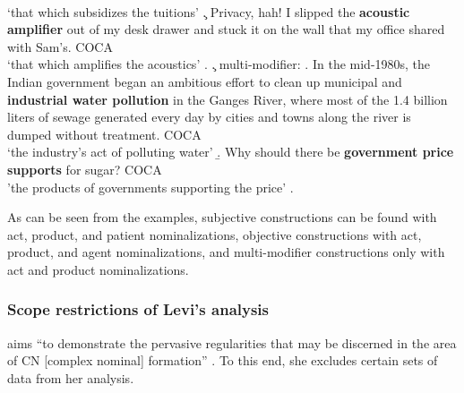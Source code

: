 \\`that which subsidizes the tuitions'
\c. \label{ex:acoustic_amplifier}
Privacy, hah! I slipped the \textbf{acoustic amplifier} out of my desk
drawer and stuck it on the wall that my office shared with Sam's. COCA
\\`that which amplifies the acoustics'
\z.
\c. multi-modifier:
\a.  \label{ex:industrial_water_pollution}
In the mid-1980s, the Indian government began an ambitious effort
to clean up municipal and \textbf{industrial water pollution} in the Ganges
River, where most of the 1.4 billion liters of sewage generated every
day by cities and towns along the river is dumped without treatment. COCA 
\\`the industry's act of polluting water'
\b. \label{ex:government_price_supports}
Why should there be \textbf{government price supports} for sugar? COCA
\\'the products of governments supporting the price'
\z.

As can be seen from the examples, subjective constructions can be found with
act, product, and patient nominalizations, objective constructions with act,
product, and agent nominalizations, and multi-modifier constructions only with
act and product nominalizations.

\subsubsection{Scope restrictions of Levi's analysis}
\label{sec:levi_scope}
\citet{Levi:1978} aims ``to demonstrate
the pervasive regularities that may be discerned in the area of
CN [complex nominal]
formation'' \citep[269]{Levi:1978}. To this end, she excludes certain sets of data
from her analysis.

